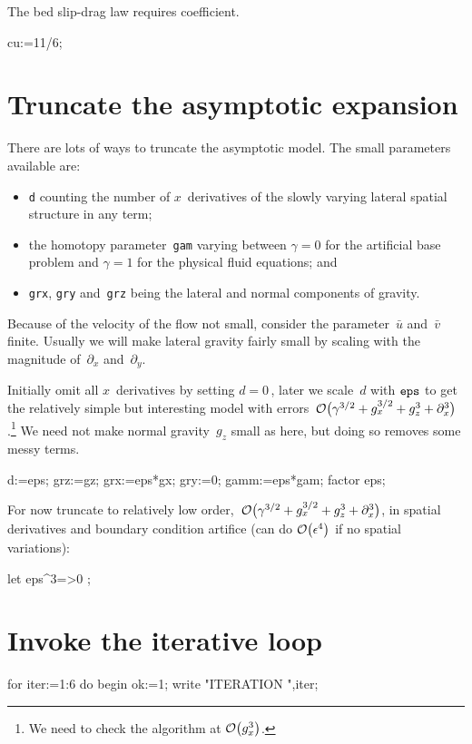 \documentclass[12pt,a5paper]{article}
\newcommand{\uu}{{\bar u}}
\newcommand{\vv}{{\bar v}}
\begin{document}
The bed slip-drag law requires coefficient.
\begin{reduce}
cu:=11/6;
\end{reduce}




\section{Truncate the asymptotic expansion}

There are lots of ways to truncate the asymptotic model.  The small
parameters available are:
\begin{itemize}
    \item  \verb|d| counting the number of $x$~derivatives of
    the slowly varying lateral spatial structure in any term;

    \item  the homotopy parameter~\verb|gam| varying between
    $\gamma=0$ for the artificial base problem and $\gamma=1$ for the
    physical fluid equations; and

    \item  \verb|grx|, \verb|gry| and~\verb|grz| being the lateral and normal
    components of gravity.
\end{itemize}
Because of the velocity of the flow not  small, consider the parameter~$\uu$ and~$\vv$ finite. Usually we will make lateral gravity fairly small by scaling with the magnitude
of~$\partial_x$ and~$\partial_y$.

Initially omit all $x$~derivatives by setting $d=0$\,, later we
scale~$d$ with $\verb|eps|$ to get the relatively simple but interesting
model with errors~$\Ord{\gamma^{3/2}+g_x^{3/2}+g_z^3+\partial_x^3}$.\footnote{We need to check the algorithm at $\Ord{g_x^3}$.}  We need not make normal gravity~$g_z$ small as here, but doing so removes some messy terms.

\begin{reduce}
d:=eps;
grz:=gz;
grx:=eps*gx;
gry:=0;
gamm:=eps*gam;
factor eps;
\end{reduce}

For now truncate to relatively low order,~$\Ord{\gamma^{3/2}+g_x^{3/2}+g_z^3+\partial_x^3}$, in spatial derivatives and boundary condition artifice (can do $\Ord{\epsilon^4}$ if no spatial variations):   

\begin{reduce}
let { eps^3=>0 };
\end{reduce}

\section{Invoke the iterative loop}
\begin{reduce}
for iter:=1:6 do begin ok:=1;
write "ITERATION ",iter;
\end{reduce}
\end{document}
